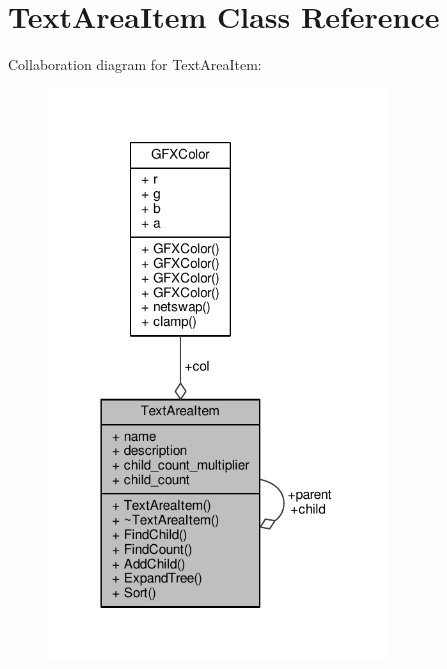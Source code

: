 \hypertarget{classTextAreaItem}{}\section{Text\+Area\+Item Class Reference}
\label{classTextAreaItem}


Collaboration diagram for Text\+Area\+Item\+:
\nopagebreak
\begin{figure}[H]
\begin{center}
\leavevmode
\includegraphics[width=254pt]{de/dc6/classTextAreaItem__coll__graph}
\end{center}
\end{figure}
